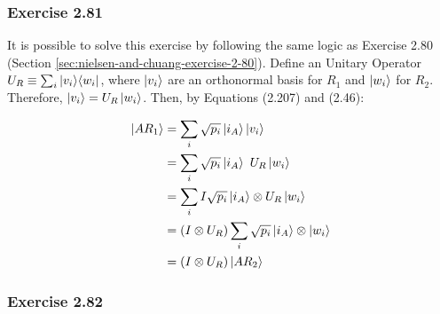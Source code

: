 \subsubsection{Exercise 2.81}
It is possible to solve this exercise by following the same logic as Exercise 2.80
(Section \ref{sec:nielsen-and-chuang-exercise-2-80}).
Define an Unitary Operator $U_R \equiv \sum_i \mathop{\mathinner{ |{v_i}\rangle \langle{w_i}|}}$,
where $\ket{v_i}$ are an orthonormal basis for $R_1$ and $\ket{w_i}$ for $R_2$.
Therefore, $\ket{v_i} = U_R \ket{w_i}$.
Then, by Equations (2.207) and (2.46):

\begin{align}
    \ket{AR_1} &= \sum_i \sqrt{p_i} \ket{i_A} \ket{v_i} \\
    &= \sum_i \sqrt{p_i} \ket{i_A}\ U_R \ket{w_i} \\
    &= \sum_i I \sqrt{p_i} \ket{i_A} \otimes U_R \ket{w_i} \\
    &= (I \otimes U_R) \sum_i \sqrt{p_i} \ket{i_A} \otimes \ket{w_i} \\
    &= (I \otimes U_R) \ket{AR_2}
\end{align}

\subsubsection{Exercise 2.82}
\label{sec:nielsen-and-chuang-exercise-2-82}

